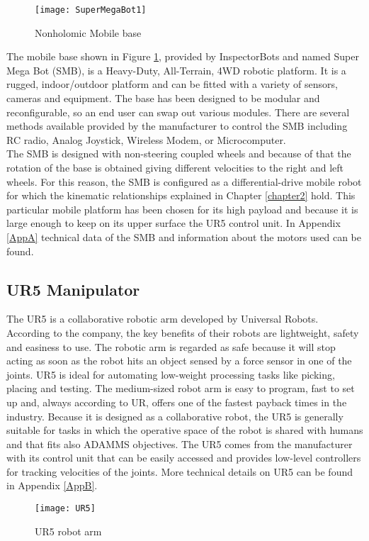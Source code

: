 \begin{figure}[h]
\begin{center} 
	\texttt{[image: SuperMegaBot1]}
	\centering
	\caption{Nonholomic Mobile base}
	\label{fig:SuperMegaBot1}
\end{center}
\end{figure}
The mobile base shown in Figure \ref{fig:SuperMegaBot1}, provided by InspectorBots and named Super Mega Bot (SMB), is a Heavy-Duty, All-Terrain, 4WD robotic platform. It is a rugged, indoor/outdoor platform and can be fitted with a variety of sensors, cameras and equipment. The base has been designed to be modular and reconfigurable, so an end user can swap out various modules. There are several methods available provided by the manufacturer to control the SMB including RC radio, Analog Joystick, Wireless Modem, or Microcomputer.\\
The SMB is designed with non-steering coupled wheels and because of that the rotation of the base is obtained giving different velocities to the right and left wheels. For this reason, the SMB is configured as a differential-drive mobile robot for which the kinematic relationships explained in Chapter \ref{chapter2} hold. This particular mobile platform has been chosen for its high payload and because it is large enough to keep on its upper surface the UR5 control unit. In Appendix \ref{AppA} technical data of the SMB and information about the motors used can be found.

\subsection{UR5 Manipulator}
The UR5 is a collaborative robotic arm developed by Universal Robots. According to the company, the key benefits of their robots are lightweight, safety and easiness to use. The robotic arm is regarded as safe because it will stop acting as soon as the robot hits an object sensed by a force sensor in one of the joints. UR5 is ideal for automating low-weight processing tasks like picking, placing and testing. The medium-sized robot arm is easy to program, fast to set up and, always according to UR, offers one of the fastest payback times in the industry. Because it is designed as a collaborative robot, the UR5 is generally suitable for tasks in which the operative space of the robot is shared with humans and that fits also ADAMMS objectives. The UR5 comes from the manufacturer with its control unit that can be easily accessed and provides low-level controllers for tracking velocities of the joints. More technical details on UR5 can be found in Appendix \ref{AppB}.
\begin{figure}[htbp]
\begin{center} 
	\texttt{[image: UR5]}
	\centering
	\label{fig:UR5}
	\caption{UR5 robot arm} 
\end{center}
\end{figure}
